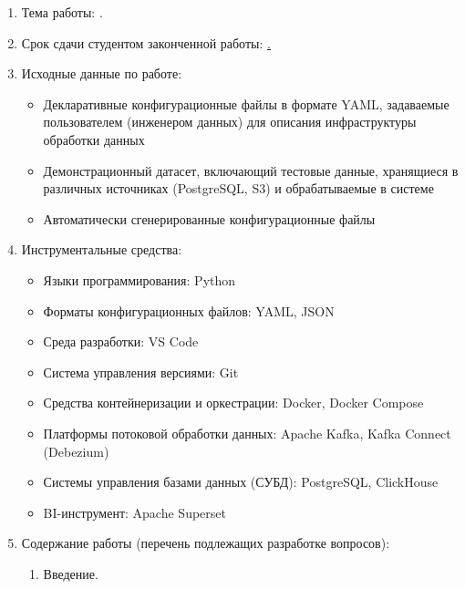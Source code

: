 \begin{enumerate}[1.]
	\item Тема работы: {\expandafter \ulined \thesisTitle.}
	\item Срок сдачи студентом законченной работы: \uline{\thesisDeadline.}
	\item Исходные данные по работе:%
	      \begin{itemize}
		      \item Декларативные конфигурационные файлы в формате YAML, задаваемые пользователем (инженером данных) для описания инфраструктуры обработки данных
		      \item Демонстрационный датасет, включающий тестовые данные, хранящиеся в различных источниках (PostgreSQL, S3) и обрабатываемые в системе
		      \item Автоматически сгенерированные конфигурационные файлы
	      \end{itemize}
	\item Инструментальные средства:
	      \begin{itemize}
		      \item Языки программирования: Python
		      \item Форматы конфигурационных файлов: YAML, JSON
		      \item Среда разработки: VS Code
		      \item Система управления версиями: Git
		      \item Средства контейнеризации и оркестрации: Docker, Docker Compose
		      \item Платформы потоковой обработки данных: Apache Kafka, Kafka Connect (Debezium)
		      \item Системы управления базами данных (СУБД): PostgreSQL, ClickHouse
		      \item BI-инструмент: Apache Superset
	      \end{itemize}
	\item Содержание работы (перечень подлежащих разработке вопросов):
	      \begin{enumerate}[label=\theenumi\arabic*.]
		      \item Введение.

\end{enumerate}
\end{enumerate}
